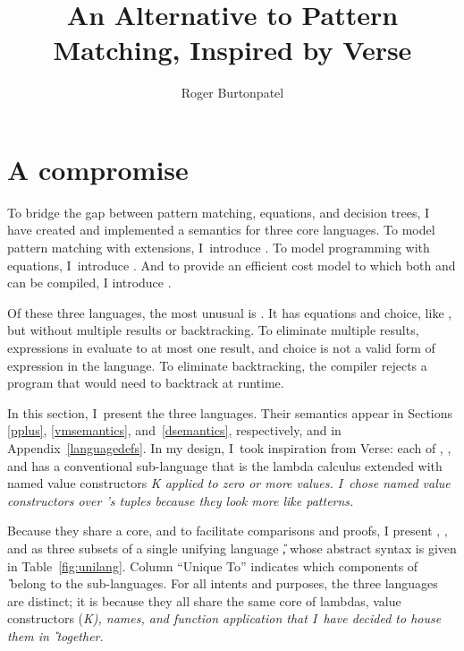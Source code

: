 \documentclass[manuscript,screen,review, 12pt, nonacm]{acmart}
\title{An Alternative to Pattern Matching, Inspired by Verse}
\author{Roger Burtonpatel}
\affiliation{%
\institution{Tufts University}
\streetaddress{419 Boston Ave}
  \city{Medford}
  \state{Massachusetts}
  \country{USA}
  \postcode{02155}
  }
\begin{document}
  
\section{A compromise}
\label{compromise}
    
    To bridge the gap between pattern matching, equations, and decision trees, I
    have created and implemented a semantics for three core languages. To model
    pattern matching with extensions, I~introduce \PPlus. To model programming
    with equations, I~introduce \VMinus. And to provide an
    efficient cost model to which both \PPlus and \VMinus can be compiled, I
    introduce \D.

    Of these three languages, the most unusual is \VMinus. It has equations and
    choice, like \VC, but without multiple results or backtracking. To eliminate
    multiple results, expressions in \VMinus evaluate to at most one result,
    and choice is not a valid form of expression in the language. To eliminate
    backtracking, the compiler rejects a \VMinus program that would need to
    backtrack at runtime. 
    

    In this section, I~present the three languages. Their semantics appear in
    Sections \ref{pplus}, \ref{vmsemantics}, and~\ref{dsemantics},
    respectively, and in Appendix~\ref{languagedefs}. In my design, I~took
    inspiration from Verse: each of \PPlus, \VMinus, and \D has a conventional
    sub-language that is the lambda calculus extended with named value
    constructors \it{K} applied to zero or more values. I~chose named value
    constructors over \VC's tuples because they look more like patterns. 
    
    Because they share a core, and to facilitate comparisons and proofs, I
    present \VMinus, \PPlus, and \D as three subsets of a single unifying
    language \U, whose abstract syntax is given in Table~\ref{fig:unilang}.
    Column “Unique To” indicates which components of \U\ belong to the
    sub-languages. For all intents and purposes, the three languages are
    distinct; it is because they all share the same core of lambdas, value
    constructors (\it{K}), names, and function application that I~have decided
    to house them in \U\ together. 
    
\end{document}
